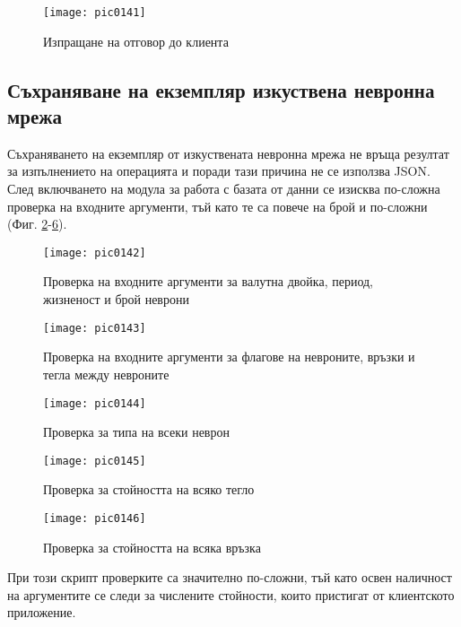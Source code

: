 \begin{figure}[h]
  \centering
  \texttt{[image: pic0141]}
  \caption{Изпращане на отговор до клиента}
\label{fig:pic0141}
\end{figure}
\FloatBarrier

\subsection{Съхраняване на екземпляр изкуствена невронна мрежа}

Съхраняването на екземпляр от изкуствената невронна мрежа не връща резултат за изпълнението на операцията и поради тази причина не се използва JSON. След включването на модула за работа с базата от данни се изисква по-сложна проверка на входните аргументи, тъй като те са повече на брой и по-сложни (Фиг. \ref{fig:pic0142}-\ref{fig:pic0146}). 

\begin{figure}[h]
  \centering
  \texttt{[image: pic0142]}
  \caption{Проверка на входните аргументи за валутна двойка, период, жизненост и брой неврони}
\label{fig:pic0142}
\end{figure}
\FloatBarrier

\begin{figure}[h]
  \centering
  \texttt{[image: pic0143]}
  \caption{Проверка на входните аргументи за флагове на невроните, връзки и тегла между невроните}
\label{fig:pic0143}
\end{figure}
\FloatBarrier

\begin{figure}[h]
  \centering
  \texttt{[image: pic0144]}
  \caption{Проверка за типа на всеки неврон}
\label{fig:pic0144}
\end{figure}
\FloatBarrier

\begin{figure}[h]
  \centering
  \texttt{[image: pic0145]}
  \caption{Проверка за стойността на всяко тегло}
\label{fig:pic0145}
\end{figure}
\FloatBarrier

\begin{figure}[h]
  \centering
  \texttt{[image: pic0146]}
  \caption{Проверка за стойността на всяка връзка}
\label{fig:pic0146}
\end{figure}
\FloatBarrier

При този скрипт проверките са значително по-сложни, тъй като освен наличност на аргументите се следи за числените стойности, които пристигат от клиентското приложение. 

